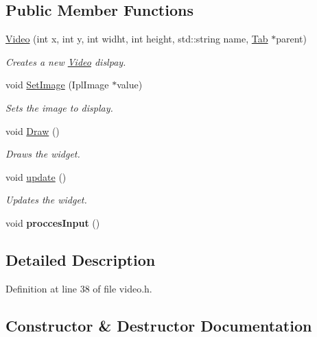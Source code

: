 \subsection*{Public Member Functions}
\begin{DoxyCompactItemize}
\item 
\hyperlink{class_video_a992e46fb5bb3b423768d30788a965fba}{Video} (int x, int y, int widht, int height, std\+::string name, \hyperlink{class_tab}{Tab} $\ast$parent)
\begin{DoxyCompactList}\small\item\em Creates a new \hyperlink{class_video}{Video} dislpay. \end{DoxyCompactList}\item 
void \hyperlink{class_video_a7b1ff4d51ad92b96c8b23642a3634cc0}{Set\+Image} (Ipl\+Image $\ast$value)
\begin{DoxyCompactList}\small\item\em Sets the image to display. \end{DoxyCompactList}\item 
void \hyperlink{class_video_ae6377f888f7d485fddde3df9abaa4eda}{Draw} ()
\begin{DoxyCompactList}\small\item\em Draws the widget. \end{DoxyCompactList}\item 
void \hyperlink{class_video_a91036fd835d742420767e9a7af9e62fb}{update} ()
\begin{DoxyCompactList}\small\item\em Updates the widget. \end{DoxyCompactList}\item 
\mbox{\label{class_video_a038dc566376b70f5c84ded49b54b93e6}} 
void {\bfseries procces\+Input} ()
\end{DoxyCompactItemize}


\subsection{Detailed Description}


Definition at line 38 of file video.\+h.



\subsection{Constructor \& Destructor Documentation}
\mbox{\label{class_video_a992e46fb5bb3b423768d30788a965fba}} 
